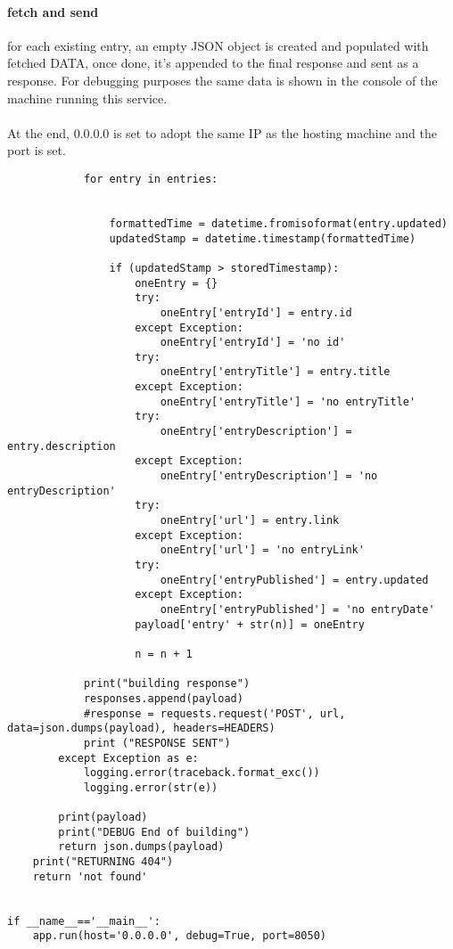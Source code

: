 \documentclass{article}
\begin{document}
\paragraph{fetch and send}
for each existing entry, an empty JSON object is created and populated with fetched DATA, once done, it's appended to the final response and sent as a response. For debugging purposes the same data is shown in the console of the machine running this service.

\paragraph{}
At the end, 0.0.0.0 is set to adopt the same IP as the hosting machine and the port is set.
\begin{lstlisting}
            for entry in entries:


                formattedTime = datetime.fromisoformat(entry.updated)
                updatedStamp = datetime.timestamp(formattedTime)

                if (updatedStamp > storedTimestamp):
                    oneEntry = {}
                    try:
                        oneEntry['entryId'] = entry.id
                    except Exception:
                        oneEntry['entryId'] = 'no id'
                    try:
                        oneEntry['entryTitle'] = entry.title
                    except Exception:
                        oneEntry['entryTitle'] = 'no entryTitle'
                    try:
                        oneEntry['entryDescription'] = entry.description
                    except Exception:
                        oneEntry['entryDescription'] = 'no entryDescription'
                    try:
                        oneEntry['url'] = entry.link
                    except Exception:
                        oneEntry['url'] = 'no entryLink'
                    try:
                        oneEntry['entryPublished'] = entry.updated
                    except Exception:
                        oneEntry['entryPublished'] = 'no entryDate'
                    payload['entry' + str(n)] = oneEntry

                    n = n + 1

            print("building response")
            responses.append(payload)
            #response = requests.request('POST', url, data=json.dumps(payload), headers=HEADERS)
            print ("RESPONSE SENT")
        except Exception as e:
            logging.error(traceback.format_exc())
            logging.error(str(e))

        print(payload)
        print("DEBUG End of building")
        return json.dumps(payload)
    print("RETURNING 404")
    return 'not found'


if __name__=='__main__':
    app.run(host='0.0.0.0', debug=True, port=8050)
\end{lstlisting}
\end{document}
